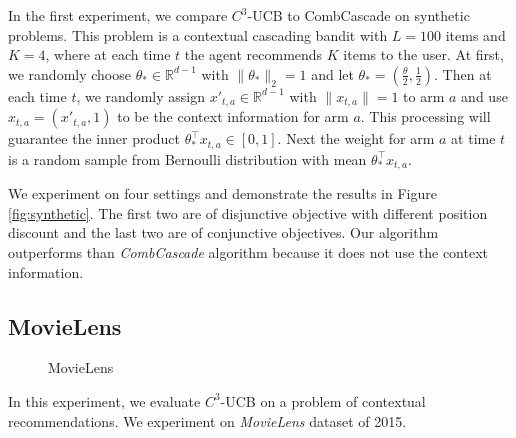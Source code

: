 \documentclass{article}
\newcommand{\RR}{\mathbb{R}}
\begin{document}
In the first experiment, we compare $C^3$-UCB to CombCascade on synthetic problems. This problem is a contextual cascading bandit with $L=100$ items and $K=4$, where at each time $t$ the agent recommends $K$ items to the user. At first, we randomly choose $\theta_* \in \RR^{d-1}$ with $\|\theta_{\ast}\|_2 = 1$ and let $\theta_* = (\frac{\theta}{2}, \frac{1}{2})$. Then at each time $t$, we randomly assign $x'_{t,a} \in \RR^{d-1}$ with $\|x_{t,a}\| = 1$ to arm $a$ and use $x_{t,a} = (x'_{t,a}, 1)$ to be the context information for arm $a$. This processing will guarantee the inner product $\theta_*^{\top}x_{t,a} \in [0,1]$. Next the weight for arm $a$ at time $t$ is a random sample from Bernoulli distribution with mean $\theta_*^{\top}x_{t,a}$.

We experiment on four settings and demonstrate the results in Figure \ref{fig:synthetic}. The first two are of disjunctive objective with different position discount and the last two are of conjunctive objectives. Our algorithm outperforms than {\it CombCascade} algorithm because it does not use the context information.


\subsection{MovieLens}

\begin{figure}
	\centering
	\caption{MovieLens}
	\label{fig:movielens} %
\end{figure}

In this experiment, we evaluate $C^3$-UCB on a problem of contextual recommendations. We experiment on {\it MovieLens} dataset\cite{lam2013movie} of 2015.
\end{document}

